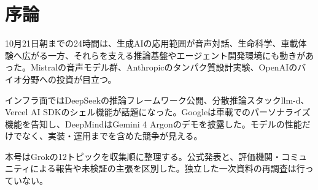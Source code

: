 \section*{序論}
10月21日朝までの24時間は、生成AIの応用範囲が音声対話、生命科学、車載体験へ広がる一方、それらを支える推論基盤やエージェント開発環境にも動きがあった。Mistralの音声モデル群、Anthropicのタンパク質設計実験、OpenAIのバイオ分野への投資が目立つ。

インフラ面ではDeepSeekの推論フレームワーク公開、分散推論スタックllm-d、Vercel AI SDKのシェル機能が話題になった。Googleは車載でのパーソナライズ機能を告知し、DeepMindはGemini 4 Argonのデモを披露した。モデルの性能だけでなく、実装・運用までを含めた競争が見える。

本号はGrokの12トピックを収集順に整理する。公式発表と、評価機関・コミュニティによる報告や未検証の主張を区別した。独立した一次資料の再調査は行っていない。

